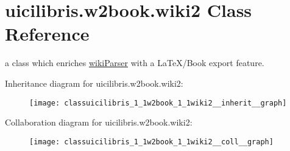 \hypertarget{classuicilibris_1_1w2book_1_1wiki2}{\section{uicilibris.\-w2book.\-wiki2 \-Class \-Reference}
\label{classuicilibris_1_1w2book_1_1wiki2}
}


a class which enriches \hyperlink{namespaceuicilibris_1_1wikiParser}{wiki\-Parser} with a \-La\-Te\-X/\-Book export feature.  




\-Inheritance diagram for uicilibris.\-w2book.\-wiki2\-:
\nopagebreak
\begin{figure}[H]
\begin{center}
\leavevmode
\texttt{[image: classuicilibris\_1\_1w2book\_1\_1wiki2\_\_inherit\_\_graph]}
\end{center}
\end{figure}


\-Collaboration diagram for uicilibris.\-w2book.\-wiki2\-:
\nopagebreak
\begin{figure}[H]
\begin{center}
\leavevmode
\texttt{[image: classuicilibris\_1\_1w2book\_1\_1wiki2\_\_coll\_\_graph]}
\end{center}
\end{figure}
